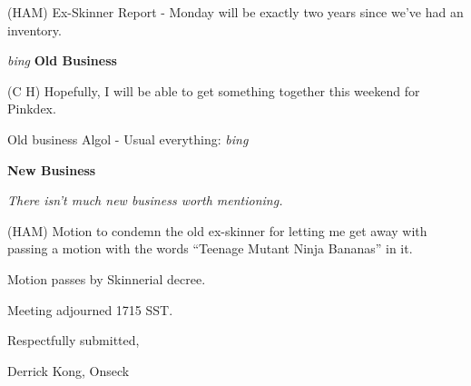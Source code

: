 (HAM) Ex-Skinner Report - Monday will be exactly two years since we've
had an inventory.

\vspace{0.15in}
{\em bing\/} {\bf Old Business}

(C H) Hopefully, I will be able to get something together this weekend
for Pinkdex.

Old business Algol - Usual everything: {\em bing\/}

\vspace{0.15in}
{\bf New Business}

{\em There isn't much new business worth mentioning.}

(HAM) Motion to condemn the old ex-skinner for letting me get away with
passing a motion with the words ``Teenage Mutant Ninja Bananas'' in
it.

Motion passes by Skinnerial decree.

Meeting adjourned 1715 SST.

\vspace{0.15in}
\begin{center}
Respectfully submitted,

Derrick Kong, Onseck
\end{center}

